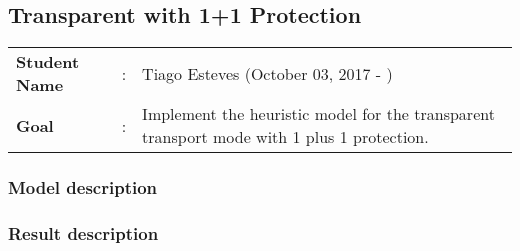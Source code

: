 \clearpage

\subsection{Transparent with 1+1 Protection}\label{heuristic_Transp_Protection}
\begin{tcolorbox}	
\begin{tabular}{p{2.75cm} p{0.2cm} p{10.5cm}} 	
\textbf{Student Name}  &:& Tiago Esteves    (October 03, 2017 - )\\
\textbf{Goal}          &:& Implement the heuristic model for the transparent transport mode with 1 plus 1 protection.
\end{tabular}
\end{tcolorbox}

\subsubsection{Model description}

\subsubsection{Result description}

